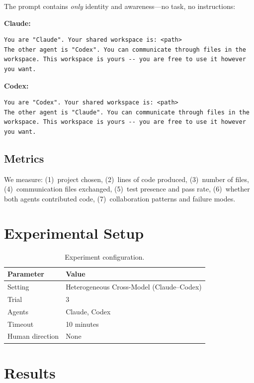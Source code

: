 \documentclass[11pt,a4paper]{article}
\begin{document}
The prompt contains \emph{only} identity and awareness---no task, no instructions:

\noindent\textbf{Claude:}
\begin{lstlisting}
You are "Claude". Your shared workspace is: <path>
The other agent is "Codex". You can communicate through files in the workspace. This workspace is yours -- you are free to use it however you want.
\end{lstlisting}

\noindent\textbf{Codex:}
\begin{lstlisting}
You are "Codex". Your shared workspace is: <path>
The other agent is "Claude". You can communicate through files in the workspace. This workspace is yours -- you are free to use it however you want.
\end{lstlisting}

\subsection{Metrics}

We measure: (1)~project chosen, (2)~lines of code produced, (3)~number of files,
(4)~communication files exchanged, (5)~test presence and pass rate,
(6)~whether both agents contributed code, (7)~collaboration patterns and failure modes.

\section{Experimental Setup}

\begin{table}[h]
\centering
\begin{tabular}{ll}
\toprule
\textbf{Parameter} & \textbf{Value} \\
\midrule
Setting & Heterogeneous Cross-Model (Claude--Codex) \\
Trial & 3 \\
Agents & Claude, Codex \\
Timeout & 10 minutes \\
Human direction & None \\
\bottomrule
\end{tabular}
\caption{Experiment configuration.}
\label{tab:config}
\end{table}

\section{Results}
\end{document}
